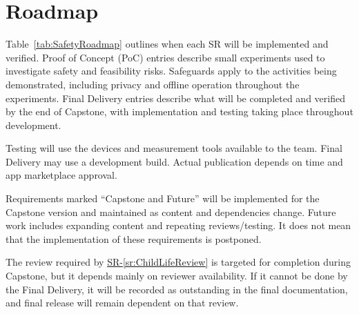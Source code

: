 \documentclass{article}
\newcounter{sr}
\newcommand{\srref}[1]{\hyperref[sr:#1]{SR-\ref*{sr:#1}}}
\begin{document}
\section{Roadmap}
\label{sec_Roadmap}

Table~\ref{tab:SafetyRoadmap} outlines when each SR will be
implemented and verified. Proof of Concept (PoC) entries describe small experiments used to investigate
safety and feasibility risks. Safeguards apply to the activities being
demonstrated, including privacy and offline operation throughout the experiments.
Final Delivery entries describe what will be completed and verified by the end
of Capstone, with implementation and testing taking place throughout development.

Testing will use the devices and measurement tools available to the team. Final Delivery may use a
development build. Actual publication depends on time and app marketplace approval.

Requirements marked ``Capstone and Future'' will be implemented for the Capstone
version and maintained as content and dependencies change.
Future work includes expanding content and repeating reviews/testing. It does not mean that the implementation of
these requirements is postponed.

The review required by \srref{ChildLifeReview} is targeted for completion during
Capstone, but it depends mainly on reviewer availability. If it cannot be done by the
Final Delivery, it will be recorded as outstanding in the final documentation, and final release will remain dependent on
that review.
\end{document}
